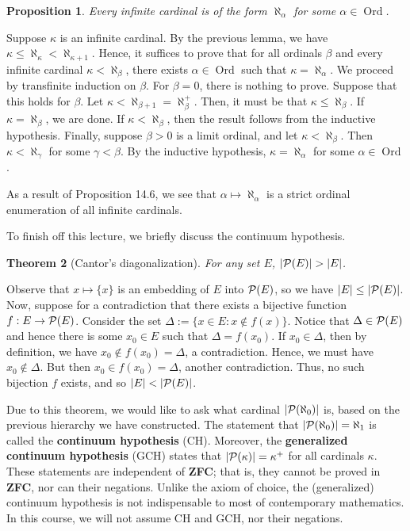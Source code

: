 \documentclass[10pt]{article}
\makeatletter
\DeclareMathOperator{\Ord}{Ord}
\theoremstyle{newstyle}
\newtheorem{thm}{Theorem}[section]
\newtheorem{prop}[thm]{Proposition}
\newenvironment{pf}[1][\proofname]{\par
  \pushQED{\qed}%
  \normalfont \topsep0\p@\relax
  \trivlist
  \item[\hskip\labelsep\scshape
  #1\@addpunct{.}]\ignorespaces
}{%
  \popQED\endtrivlist\@endpefalse
}
\makeatother
\begin{document}
\begin{prop}
Every infinite cardinal is of the form $\aleph_\alpha$ for some $\alpha \in \Ord$. 
\end{prop}
\begin{pf}
Suppose $\kappa$ is an infinite cardinal. By the previous lemma, we have 
$\kappa \leq \aleph_\kappa < \aleph_{\kappa+1}$. Hence, it suffices to prove that for all 
ordinals $\beta$ and every infinite cardinal $\kappa < \aleph_\beta$, there exists 
$\alpha \in \Ord$ such that $\kappa = \aleph_\alpha$. We proceed by transfinite induction on $\beta$. 
For $\beta = 0$, there is nothing to prove. Suppose that this holds for $\beta$. 
Let $\kappa < \aleph_{\beta+1} = \aleph_\beta^+$. Then, it must be that 
$\kappa \leq \aleph_\beta$. If $\kappa = \aleph_\beta$, we are done. If 
$\kappa < \aleph_\beta$, then the result follows from the inductive hypothesis. 
Finally, suppose $\beta > 0$ is a limit ordinal, and let $\kappa < \aleph_\beta$. 
Then $\kappa < \aleph_\gamma$ for some $\gamma < \beta$. By 
the inductive hypothesis, $\kappa = \aleph_\alpha$ for some $\alpha \in \Ord$. 
\end{pf}

As a result of Proposition 14.6, we see that $\alpha \mapsto \aleph_\alpha$ is a strict 
ordinal enumeration of all infinite cardinals. 

To finish off this lecture, we briefly discuss the continuum hypothesis. 

\begin{thm}[Cantor's diagonalization] 
For any set $E$, $|{\cal P}(E)| > |E|$. 
\end{thm}
\begin{pf}
Observe that $x \mapsto \{x\}$ is an embedding of $E$ into ${\cal P}(E)$, so we have 
$|E| \leq |{\cal P}(E)|$. Now, suppose for a contradiction that there exists a 
bijective function $f : E \to {\cal P}(E)$. Consider the set 
$\Delta := \{x \in E : x \notin f(x)\}$. Notice that $\Delta \in {\cal P}(E)$ and hence 
there is some $x_0 \in E$ such that $\Delta = f(x_0)$. If $x_0 \in \Delta$, then 
by definition, we have $x_0 \notin f(x_0) = \Delta$, a contradiction. Hence, we must have 
$x_0 \notin \Delta$. But then $x_0 \in f(x_0) = \Delta$, another contradiction. Thus, 
no such bijection $f$ exists, and so $|E| < |{\cal P}(E)|$.
\end{pf}

Due to this theorem, we would like to ask what cardinal $|{\cal P}(\aleph_0)|$ is, based on the previous hierarchy 
we have constructed. The statement that $|{\cal P}(\aleph_0)| = \aleph_1$ 
is called the {\bf continuum hypothesis} (CH). Moreover, the {\bf generalized continuum hypothesis} 
(GCH) states that $|{\cal P}(\kappa)| = \kappa^+$ for all cardinals $\kappa$. 
These statements are independent of {\bf ZFC}; that is, they cannot be proved in {\bf ZFC}, 
nor can their negations. Unlike the axiom of choice, the (generalized) continuum hypothesis 
is not indispensable to most of contemporary mathematics. In this course, we will not assume CH and GCH, 
nor their negations.
\end{document}
